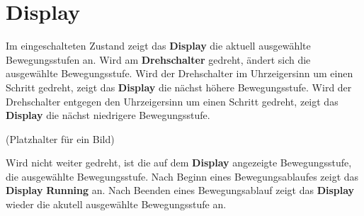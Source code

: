 %
%

\chapter{Display}
Im eingeschalteten Zustand zeigt das \textbf{Display} die aktuell ausgewählte Bewegungsstufen an. Wird am \textbf{Drehschalter} gedreht, ändert sich die ausgewählte Bewegungsstufe. Wird der Drehschalter im Uhrzeigersinn um einen Schritt gedreht, zeigt das \textbf{Display} die nächst höhere Bewegungsstufe. Wird der Drehschalter entgegen den Uhrzeigersinn um einen Schritt gedreht, zeigt das \textbf{Display} die nächst niedrigere Bewegungsstufe.

(Platzhalter für ein Bild)


 Wird nicht weiter gedreht, ist die auf dem \textbf{Display} angezeigte Bewegungsstufe, die ausgewählte Bewegungsstufe. Nach Beginn eines Bewegungsablaufes zeigt das \textbf{Display} \textbf{Running} an. Nach Beenden eines Bewegungsablauf zeigt das \textbf{Display} wieder die akutell ausgewählte Bewegungsstufe an. 

